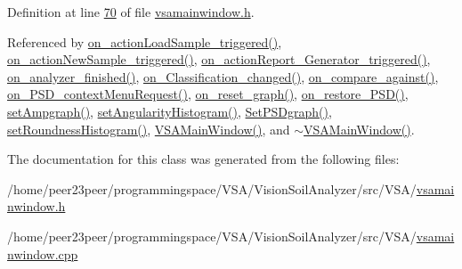 Definition at line \hyperlink{vsamainwindow_8h_source_l00070}{70} of file \hyperlink{vsamainwindow_8h_source}{vsamainwindow.\+h}.



Referenced by \hyperlink{vsamainwindow_8cpp_source_l00475}{on\+\_\+action\+Load\+Sample\+\_\+triggered()}, \hyperlink{vsamainwindow_8cpp_source_l00361}{on\+\_\+action\+New\+Sample\+\_\+triggered()}, \hyperlink{vsamainwindow_8cpp_source_l00552}{on\+\_\+action\+Report\+\_\+\+Generator\+\_\+triggered()}, \hyperlink{vsamainwindow_8cpp_source_l00275}{on\+\_\+analyzer\+\_\+finished()}, \hyperlink{vsamainwindow_8cpp_source_l00522}{on\+\_\+\+Classification\+\_\+changed()}, \hyperlink{vsamainwindow_8cpp_source_l00570}{on\+\_\+compare\+\_\+against()}, \hyperlink{vsamainwindow_8cpp_source_l00561}{on\+\_\+\+P\+S\+D\+\_\+context\+Menu\+Request()}, \hyperlink{vsamainwindow_8cpp_source_l00545}{on\+\_\+reset\+\_\+graph()}, \hyperlink{vsamainwindow_8cpp_source_l00628}{on\+\_\+restore\+\_\+\+P\+S\+D()}, \hyperlink{vsamainwindow_8cpp_source_l00339}{set\+Ampgraph()}, \hyperlink{vsamainwindow_8cpp_source_l00315}{set\+Angularity\+Histogram()}, \hyperlink{vsamainwindow_8cpp_source_l00285}{Set\+P\+S\+Dgraph()}, \hyperlink{vsamainwindow_8cpp_source_l00291}{set\+Roundness\+Histogram()}, \hyperlink{vsamainwindow_8cpp_source_l00004}{V\+S\+A\+Main\+Window()}, and \hyperlink{vsamainwindow_8cpp_source_l00254}{$\sim$\+V\+S\+A\+Main\+Window()}.



The documentation for this class was generated from the following files\+:\begin{DoxyCompactItemize}
\item 
/home/peer23peer/programmingspace/\+V\+S\+A/\+Vision\+Soil\+Analyzer/src/\+V\+S\+A/\hyperlink{vsamainwindow_8h}{vsamainwindow.\+h}\item 
/home/peer23peer/programmingspace/\+V\+S\+A/\+Vision\+Soil\+Analyzer/src/\+V\+S\+A/\hyperlink{vsamainwindow_8cpp}{vsamainwindow.\+cpp}\end{DoxyCompactItemize}
